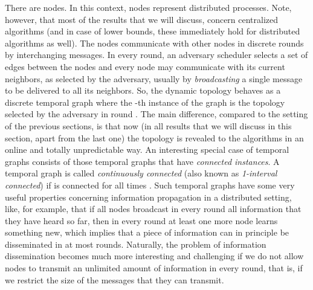 \documentclass[oribibl, 11pt]{llncs}
\begin{document}
There are  nodes. In this context, nodes represent distributed processes. Note, however, that most of the results that we will discuss, concern centralized algorithms (and in case of lower bounds, these immediately hold for distributed algorithms as well). The nodes communicate with other nodes in discrete rounds by interchanging messages. In every round, an adversary scheduler selects a set of edges between the nodes and every node may communicate with its current neighbors, as selected by the adversary, usually by \emph{broadcasting} a single message to be delivered to all its neighbors. So, the dynamic topology behaves as a discrete temporal graph where the -th instance of the graph is the topology selected by the adversary in round . The main difference, compared to the setting of the previous sections, is that now (in all results that we will discuss in this section, apart from the last one) the topology is revealed to the algorithms in an online and totally unpredictable way. An interesting special case of temporal graphs consists of those temporal graphs that have \emph{connected instances}. A temporal graph  is called \emph{continuously connected} (also known as \emph{1-interval connected}) if  is connected for all times  \cite{OW05,KLO10}. Such temporal graphs have some very useful properties concerning information propagation in a distributed setting, like, for example, that if all nodes broadcast in every round all information that they have heard so far, then in every round at least one more node learns something new, which implies that a piece of information can in principle be disseminated in at most  rounds. Naturally, the problem of information dissemination becomes much more interesting and challenging if we do not allow nodes to transmit an unlimited amount of information in every round, that is, if we restrict the size of the messages that they can transmit.
\end{document}
